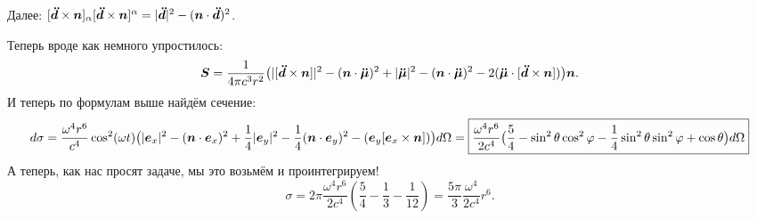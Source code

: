 Далее: $[\mbox{\boldmath $\ddot{d}$} \times \mbox{\boldmath $n$}]_\alpha [\mbox{\boldmath $\ddot{d}$} \times \mbox{\boldmath $n$}]^\alpha = |\mbox{\boldmath $\ddot{d}$}|^2 - (\mbox{\boldmath $n$} \cdot \mbox{\boldmath $\ddot{d}$})^2$.

Теперь вроде как немного упростилось:
\begin{equation*}
	\mbox{\boldmath $S$} = \frac{1}{4 \pi c^3 r^2} \big( |[\mbox{\boldmath $\ddot{d}$} \times \mbox{\boldmath $n$}]|^2 - (\mbox{\boldmath $n$} \cdot \mbox{\boldmath $\ddot{\mu}$})^2 + |\mbox{\boldmath $\ddot{\mu}$}|^2 - (\mbox{\boldmath $n$} \cdot \mbox{\boldmath $\ddot{\mu}$})^2 - 2 (\mbox{\boldmath $\ddot{\mu}$} \cdot [\mbox{\boldmath $\ddot{d}$} \times \mbox{\boldmath $n$}]) \big) \mbox{\boldmath $n$}.
\end{equation*}
И теперь по формулам выше найдём сечение:
\begin{equation*}
	d \sigma = \frac{\omega^4 r^6}{c^4} \cos^2 (\omega t)\big( |\mbox{\boldmath $e$}_x|^2 - (\mbox{\boldmath $n$} \cdot \mbox{\boldmath $e$}_x)^2 + \frac{1}{4}|\mbox{\boldmath $e$}_y|^2 - \frac{1}{4} (\mbox{\boldmath $n$} \cdot \mbox{\boldmath $e$}_y)^2 - (\mbox{\boldmath $e$}_y [\mbox{\boldmath $e$}_x \times \mbox{\boldmath $n$}])\big) d \Omega 
	= 
	\boxed{
	\frac{\omega^4 r^6}{2 c^4}
	\big( \frac{5}{4} - \sin^2 \theta \cos^2 \varphi - \frac{1}{4} \sin^2 \theta \sin^2 \varphi + \cos \theta\big) d \Omega}
\end{equation*}
А теперь, как нас просят  задаче, мы это возьмём и проинтегрируем!
\begin{equation*}
	\sigma = 2 \pi \frac{\omega^4 r^6}{2 c^4} (\frac{5}{4} -\frac{1}{3} - \frac{1}{12}) =  \frac{5 \pi}{3} \frac{\omega^4}{2 c^4} r^6.
\end{equation*}